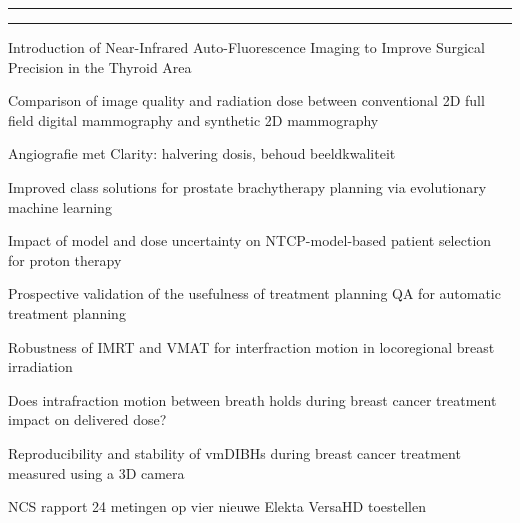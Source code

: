 \documentclass[a4paper,10pt]{report}
\begin{document}
\begin{multicols*}{3}
\vfill

\hrule\vspace{2mm}
\vspace{2mm}\hrule\strut
\vspace{-0.5cm}
\begin{packed_enum}
\item[\#1] Introduction of Near-Infrared Auto-Fluorescence Imaging to Improve Surgical Precision in the Thyroid Area
\item[\#2] Comparison of image quality and radiation dose between conventional 2D full field digital mammography and synthetic 2D mammography
\item[\#3] Angiografie met Clarity: halvering dosis, behoud beeldkwaliteit
\item[\#4] Improved class solutions for prostate brachytherapy planning via evolutionary machine learning
\item[\#5] Impact of model and dose uncertainty on NTCP-model-based patient selection for proton therapy
\item[\#6] Prospective validation of the usefulness of treatment planning QA for  automatic treatment planning
\item[\#7] Robustness of IMRT and VMAT for interfraction motion in locoregional breast irradiation
\item[\#8] Does intrafraction motion between breath holds during breast cancer treatment impact on delivered dose?
\item[\#9] Reproducibility and stability of vmDIBHs during breast cancer treatment measured using a 3D camera
\item[\#10] NCS rapport 24 metingen op vier nieuwe Elekta VersaHD toestellen
\end{packed_enum} %



\end{multicols*}
\end{document}
